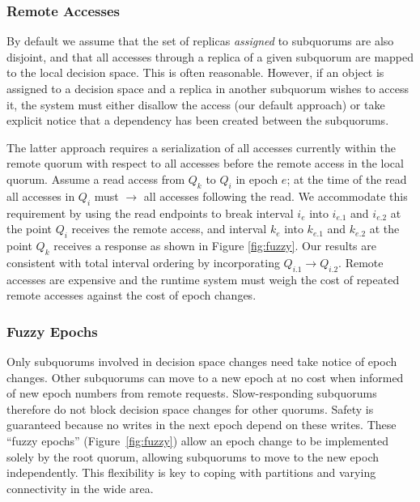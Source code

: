 \documentclass[sigconf]{acmart}
\begin{document}
\subsubsection{Remote Accesses}
\label{sec:remote}

By default we assume that the set of replicas \emph{assigned} to subquorums are also
disjoint, and that all accesses through a replica of a given subquorum are mapped to the
local decision space.
This is often reasonable.
However, if an object is assigned to a decision space and a replica in another subquorum
wishes to
access it, the system must either disallow the access (our default approach) or take
explicit notice that a dependency has been created between the subquorums.

The latter approach requires a serialization of all accesses currently within the remote
quorum with respect to all accesses before the remote access in the local quorum.
Assume a read access from $Q_k$ to $Q_i$ in epoch $e$; at the time of the read all
accesses in $Q_i$ must $\rightarrow$ all accesses following the read.
We accommodate this requirement by using the read endpoints to break interval $i_e$ into
$i_{e.1}$ and $i_{e.2}$ at the point $Q_i$ receives the remote access, and interval $k_e$
into $k_{e.1}$ and $k_{e.2}$ at the point $Q_k$ receives a response as shown in
Figure \ref{fig:fuzzy}.
Our results are consistent with total interval ordering by incorporating $Q_{i.1}
\rightarrow Q_{i.2}$.
Remote accesses are expensive and the runtime system must weigh the cost of repeated
remote accesses against the cost of epoch changes.

\subsubsection{Fuzzy Epochs}

Only subquorums involved in decision space changes need take notice of
epoch changes.
Other subquorums can move to a new epoch at no cost when informed of new epoch
numbers from remote requests.
Slow-responding subquorums therefore do not block decision space changes for other
quorums.
Safety is guaranteed because no writes in the next epoch depend on these writes.
These ``fuzzy epochs'' (Figure~\ref{fig:fuzzy}) allow an epoch change to be implemented solely by the
root quorum, allowing subquorums to move to the new epoch independently.
This flexibility is key to coping with partitions and varying connectivity in
the wide area.
\end{document}
